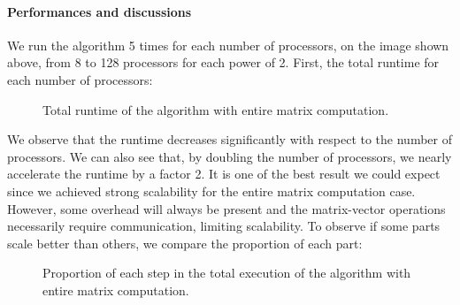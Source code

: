 \paragraph{Performances and discussions}
We run the algorithm 5 times for each number of processors, on the image shown above, from 8 to 128 processors for each power of 2.
First, the total runtime for each number of processors:
\begin{figure}[H]
  \centering
  \caption{Total runtime of the algorithm with entire matrix computation.}
\end{figure}

We observe that the runtime decreases significantly with respect to the number of processors.
We can also see that, by doubling the number of processors, we nearly accelerate the runtime by a factor 2.
It is one of the best result we could expect since we achieved strong scalability for the entire matrix computation case.
However, some overhead will always be present and the matrix-vector operations necessarily require communication, limiting scalability.
To observe if some parts scale better than others, we compare the proportion of each part:
\begin{figure}[H]
  \centering
  \caption{Proportion of each step in the total execution of the algorithm with entire matrix computation.}
\end{figure}

